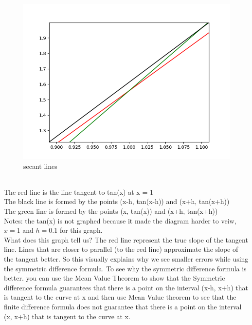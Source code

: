 \documentclass{article}
\begin{document}
\begin{enumerate}
        \begin{figure}[hb!t!]
        	\centering
        	\includegraphics[width=.75\linewidth]{tangent_to_tan.png}
        	\caption{secant lines}
        	\label{fig: secant lines}
        \end{figure} 
        \\The red line is the line tangent to tan(x) at x = 1
        \\The black line is formed by the points (x-h, tan(x-h)) and (x+h, tan(x+h))
        \\The green line is formed by the points (x, tan(x)) and (x+h, tan(x+h))
        \\Notes: the tan(x) is not graphed because it made the diagram harder to veiw, $x = 1 $ and $ h = 0.1$ for this graph. 
        \\ What does this graph tell us? The red line represent the true slope of the tangent line. Lines that are closer to parallel (to the red line) approximate the slope of the tangent better. So this visually explains why we see smaller errors while using the symmetric difference formula. To see why the symmetric difference formula is better. you can use the Mean Value Theorem to show that the Symmetric difference formula guarantees that there is a point on the interval (x-h, x+h) that is tangent to the curve at x and then use Mean Value theorem  to see that the finite difference formula does not guarantee that there is a point on the interval (x, x+h) that is tangent to the curve at x. 
    
    \end{enumerate}
\end{document}
